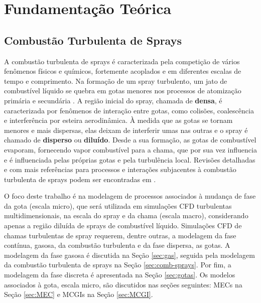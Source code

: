 

\section{Fundamentação Teórica}


\subsection{Combustão Turbulenta de Sprays} \label{sec:teoria}

A combustão turbulenta de sprays é caracterizada pela competição de vários fenômenos físicos e químicos, fortemente acoplados e em diferentes escalas de tempo e comprimento. 
Na formação de um spray turbulento, um jato de combustível líquido se quebra em gotas menores nos processos de atomização primária e secundária \cite{JennyB2012}.
A região inicial do spray, chamada de \textbf{densa}, é caracterizada por fenômenos de interação entre gotas, como colisões, coalescência e interferência por esteira aerodinâmica.
À medida que as gotas se tornam menores e mais dispersas, elas deixam de interferir umas nas outras e o spray é chamado de \textbf{disperso} ou \textbf{diluído}. 
Desde a sua formação, as gotas de combustível evaporam, fornecendo vapor combustível para a chama, que por sua vez influencia e é influenciada pelas próprias gotas e pela turbulência local.
Revisões detalhadas e com mais referências para processos e interações subjacentes à combustão turbulenta de sprays podem ser encontradas em \cite{JennyB2012, MasriA2016, SanchezA2015, ZhouL2021,JiangX2010}.

O foco deste trabalho é na modelagem de processos associados à mudança de fase da gota (escala micro), que será utilizada em simulações CFD turbulentas multidimensionais, na escala do spray e da chama (escala macro), considerando apenas a região diluída de sprays de combustível líquido.
Simulações CFD  de chamas turbulentas de spray requerem, dentre outras, a modelagem da fase contínua, gasosa, da combustão turbulenta e da fase dispersa, as gotas.
A modelagem da fase gasosa é discutida na Seção \ref{sec:gas}, seguida pela modelagem da combustão turbulenta de sprays na Seção \ref{sec:comb-sprays}. 
Por fim, a modelagem da fase discreta é apresentada na Seção \ref{sec:gotas}.
Os modelos associados à gota, escala micro, são discutidos nas seções seguintes: MECs na Seção	\ref{sec:MEC} e MCGIs na Seção \ref{sec:MCGI}.


